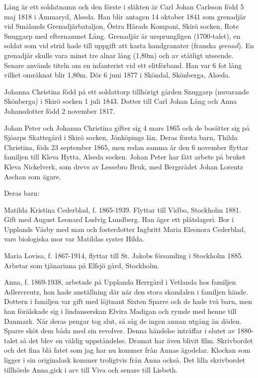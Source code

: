 Lång är ett soldatnamn och den förste i släkten är Carl Johan Carlsson född 5 maj 1818 i Ämmaryd, Alseda. Han blir antagen 14 oktober 1841 som grenadjär vid Smålands Grenadjärbataljon, Östra Härads Kompani, Skirö socken, Rote Snuggarp med efternamnet Lång. Grenadjär är ursprungligen (1700-talet), en soldat som vid strid hade till uppgift att kasta handgranater {\currvar(}franska {\it grenad}\/{\currvar)}. En grenadjär skulle vara minst tre alnar lång (1,80m) och av ståtligt utseende. Senare används titeln om en infanterist vid ett elitförband.
Han var 6 fot lång vilket omräknat blir 1,80m.
Dör 6 juni 1877 i Sköndal, Skönberga, Alseda.

Johanna Christina född på ett soldattorp tillhörigt gården Snuggarp (nuvarande Skönberga) i Skirö socken 1 juli 1843. Dotter till Carl Johan Lång och Anna Johansdotter född 2 november 1817. 



\noindent\titlcap Johan Peter och Johanna Christina gifter sig 4 mars 1865 och de bosätter sig på Sjöarps Skattegård i Skirö socken, Jönköpings län. Deras första barn, Thilda Christina, föds 23 september 1865, men redan samma år den 6 november flyttar familjen till Kleva Hytta, Alseda socken. Johan Peter har fått arbete på bruket Kleva Nickelverk, som drevs av Lessebro Bruk, med Bergsrådet Johan Lorentz Aschan som ägare. 

Deras barn:

Matilda Kristina Cederblad, f. 1865-1939. Flyttar till Vidbo, Stockholm 1881. Gift med August Leonard Ludvig Lundberg. Han äger ett plåtslageri. Bor i Upplands Väsby med man och fosterdotter Ingbritt Maria Eleonora Cederblad, vars biologiska mor var Matildas syster Hilda.

Maria Lovisa, f. 1867-1914, flyttar till St. Jakobs församling i Stockholm 1885. Arbetar som tjänarinna på Elfsjö gård, Stockholm.

Anna, f. 1869-1938, arbetade på Upplanda Herrgård i Vetlanda hos familjen Adlercreutz, hon hade anställning där när den stora skandalen i familjen hände. Dottern i familjen var gift med löjtnant Sixten Sparre och de hade två barn, men han förälskade sig i  lindanserskan Elvira Madigan och rymde med henne till Danmark. När deras pengar tog slut, så såg de ingen annan utgång än döden. Sparre sköt dem båda med sin revolver. Denna händelse inträffar i slutet av 1880-talet så det blev en väldig uppståndelse. Dramat har även blivit film. Skrivbordet och det fina blå fatet som jag har nu  kommer från Annas ägodelar. Klockan som ligger i sin originalask kommer troligtvis från Anna också. Det lilla skrivbordet tillhörde Anna,gick i arv till Viva och senare till Lisbeth.


